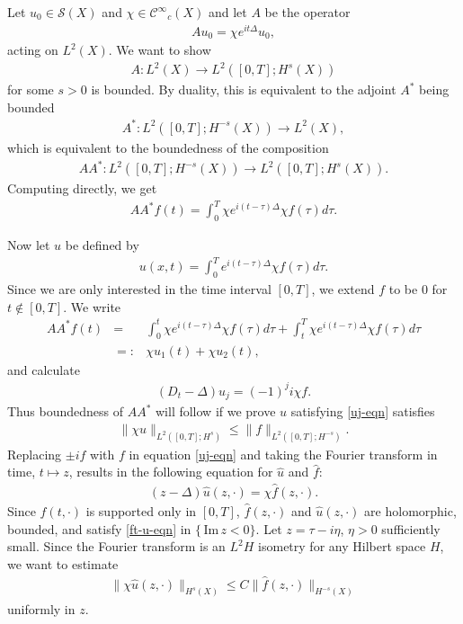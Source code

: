 \documentclass[twoside, final]{amsart}
\theoremstyle{definition}
\numberwithin{equation}{section}
\begin{document}
Let $u_0 \in {{\mathcal S}}(X)$ and $\chi \in {{\mathcal C}^\infty}_c(X)$ and let $A$ be the operator
\begin{eqnarray*}
A u_0 = \chi e^{it\Delta} u_0,
\end{eqnarray*}
acting on $L^2(X)$.  We want to show
\begin{eqnarray*}
A : L^2(X) \to L^2([0,T]; H^{s}(X))
\end{eqnarray*} 
for some $s>0$ 
is bounded.  By duality, this is equivalent to the adjoint $A^*$ being
bounded 
\begin{eqnarray*}
A^* : L^2([0,T]; H^{-s}(X)) \to L^2(X),
\end{eqnarray*}
which is equivalent to the boundedness of the composition
\begin{eqnarray*}
A A^* : L^2([0,T]; H^{-s}(X)) \to L^2([0,T]; H^{s}(X)).
\end{eqnarray*}
Computing directly, we get 
\begin{eqnarray*}
A A^* f(t) = \int_0^T \chi e^{i  (t - \tau) \Delta} \chi f( \tau) d
\tau.
\end{eqnarray*}

Now let $u$ be defined by 
\begin{eqnarray*}
u(x,t) = \int_0^T e^{i  (t - \tau) \Delta } \chi f( \tau) d
\tau.
\end{eqnarray*}
Since we are only interested in the
time interval $[0,T]$, we extend $f$ to be $0$ for $t \notin [0,T]$.
We write
\begin{eqnarray*}
A A^* f(t) & = & \int_0^t \chi e^{i  (t - \tau) \Delta} \chi f( \tau) d
\tau + \int_t^T \chi e^{i  (t - \tau) \Delta} \chi f( \tau) d
\tau \\
& = :& \chi u_1(t) + \chi u_2(t),
\end{eqnarray*}
and calculate
\begin{eqnarray}
\label{uj-eqn}
(D_t -\Delta ) u_j = (-1)^j i \chi f.
\end{eqnarray}
Thus boundedness of $A A^*$ will follow if we prove $u$ satisfying
\eqref{uj-eqn} satisfies
\begin{eqnarray*}
\| \chi u \|_{L^2([0,T];H^{s})} {\leqslant} \| f
\|_{L^2([0,T];H^{-s})}.
\end{eqnarray*}
Replacing $\pm i f$ with $f$ in equation \eqref{uj-eqn} and taking the
Fourier transform in time, $t \mapsto z$, results in the following
equation for $\hat u$ and $\hat f$:
\begin{eqnarray}
\label{ft-u-eqn}
(z -\Delta ) \hat u(z, \cdot ) = \chi \hat f (z, \cdot).
\end{eqnarray}
Since $f(t, \cdot)$ is supported only in $[0,T]$,
$\hat f(z, \cdot)$ and $\hat u(z, \cdot)$ 
are holomorphic, bounded, and satisfy \eqref{ft-u-eqn} in $\{ {\,\mathrm{Im}\,} z <0 \}$.  Let $z =
\tau - i \eta$, $\eta >0$ sufficiently small.  Since the Fourier
transform is an $L^2 H$ isometry for any Hilbert space $H$, we want to estimate 
\begin{eqnarray*}
\| \chi \hat u(z, \cdot) \|_{H^{s}(X)} {\leqslant} C \|
 \hat f(z, \cdot) \|_{H^{-s}(X)}
\end{eqnarray*}
uniformly in $z$.
\end{document}
